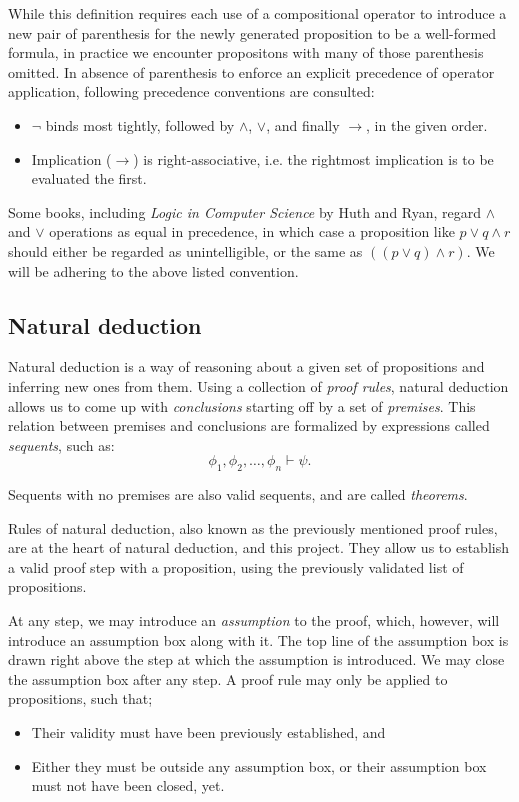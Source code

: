 \documentclass{article}
\newcommand{\imp}{\ensuremath{\rightarrow}}
\begin{document}
While this definition requires each use of a compositional operator
to introduce a new pair of parenthesis for the newly generated
proposition to be a well-formed formula, in practice we encounter
propositons with many of those parenthesis omitted. In absence of
parenthesis to enforce an explicit precedence of operator application,
following precedence conventions are consulted:

\begin{itemize}
	\item $\neg$ binds most tightly, followed by $\land$, $\lor$, and
		finally $\imp$, in the given order.
	\item Implication ($\imp$) is right-associative, i.e. the
		rightmost implication is to be evaluated the first.
\end{itemize}

Some books, including \textit{Logic in Computer Science} by Huth and Ryan,
regard $\land$ and $\lor$ operations as equal in precedence, in which
case a proposition like $p \lor q \land r$ should either be regarded
as unintelligible, or the same as $((p \lor q) \land r)$.
We will be adhering to the above listed convention.

\subsection{Natural deduction}\label{sec:intr_nd}

Natural deduction is a way of reasoning about a given set of propositions
and inferring new ones from them. Using a collection of \textit{proof rules},
natural deduction allows us to come up with \textit{conclusions} starting
off by a set of \textit{premises}. This relation between premises and
conclusions are formalized by expressions called \textit{sequents},
such as:
$$
\phi_1, \phi_2, \dotsc, \phi_n \vdash \psi.
$$

Sequents with no premises are also valid sequents, and are called
\textit{theorems}.

Rules of natural deduction, also known as the previously mentioned
proof rules, are at the heart of natural deduction, and this project.
They allow us to establish a valid proof step with a proposition,
using the previously validated list of propositions.

At any step, we may introduce an \textit{assumption} to the proof,
which, however, will introduce an assumption box along with it.
The top line of the assumption box is drawn right above the step
at which the assumption is introduced. We may close the assumption
box after any step. A proof rule may only be applied to propositions,
such that;
\begin{itemize}
	\item Their validity must have been previously established, and
	\item Either they must be outside any assumption box, or their
		assumption box must not have been closed, yet.
\end{itemize}
\end{document}
